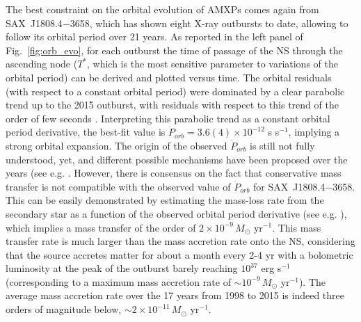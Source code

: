 \documentclass[graybox]{svmult}
\def \saxj{{\rm SAX~J1808.4$-$3658\xspace}}
\begin{document}
The best constraint on the orbital evolution of AMXPs comes again from \saxj{}, which has shown eight X-ray outbursts to date, allowing to follow its orbital period over 21 years. As reported in the left panel of Fig.~\ref{fig:orb_evo}, for each outburst the time of passage of the NS through the ascending node ($T^*$, which is the most sensitive parameter to variations of the orbital period) can be derived and plotted versus time. The orbital residuals (with respect to a constant orbital period) were dominated by a clear parabolic trend up to the 2015 outburst, with residuals with respect to this trend of the order of few seconds \cite{Sanna2017c}. Interpreting this parabolic trend as a constant orbital period derivative, the best-fit value is $\dot P_{orb} = 3.6(4) \times 10^{-12}$ s s$^{-1}$, implying a strong orbital expansion. The origin of the observed $\dot P_{orb}$ is still not fully understood, yet, and different possible mechanisms have been proposed over the years (see e.g. \cite{DiSalvo2008,Hartman2008,Burderi2009,Patruno2012b,Patruno2016}. However, there is consensus on the fact that conservative mass transfer is not compatible with the observed value of $\dot P_{orb}$ for \saxj{}. This can be easily demonstrated by estimating the mass-loss rate from the secondary star as a function of the observed orbital period derivative (see e.g. \cite{Burderi2009}), which implies a mass transfer of the order of $2 \times 10^{-9}\, M_\odot$ yr$^{-1}$. This mass transfer rate is much larger than the mass accretion rate onto the NS, considering that the source accretes matter for about a month every 2-4 yr with a bolometric luminosity at the peak of the outburst barely reaching $10^{37}$ erg s$^{-1}$ (corresponding to a maximum mass accretion rate of $\sim 10^{-9}\, M_\odot$ yr$^{-1}$). The average mass accretion rate over the 17 years from 1998 to 2015 is indeed three orders of magnitude below, $\sim 2 \times 10^{-11}\, M_\odot$ yr$^{-1}$. 
\end{document}
